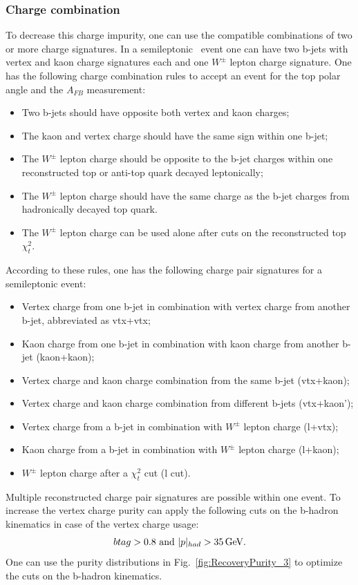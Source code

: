 \subsubsection{Charge combination}

To decrease this charge impurity, one can use the compatible combinations of two or more charge signatures.
In a semileptonic \ttbar\ event one can have two b-jets with vertex and kaon charge signatures each and one $W^\pm$ lepton charge signature. 
One has the following charge combination rules to accept an event for the top polar angle and the $A_{FB}$ measurement:
\begin{itemize}
	\item Two b-jets should have opposite both vertex and kaon charges;
	\item The kaon and vertex charge should have the same sign within one b-jet;
	\item The $W^\pm$ lepton charge should be opposite to the b-jet charges within one reconstructed top or anti-top quark decayed leptonically; 
	\item The  $W^\pm$ lepton charge should have the same charge as the b-jet charges from hadronically decayed top quark.
	\item The $W^\pm$ lepton charge can be used alone after cuts on the reconstructed top $\chi^2_{t}$.
\end{itemize}

According to these rules, one has the following charge pair signatures for a semileptonic \ttbar event:
\begin{itemize}
	\item Vertex charge from one b-jet in combination with vertex charge from another b-jet, abbreviated as {\sc vtx+vtx};
	\item Kaon charge from one b-jet in combination with kaon charge from another b-jet ({\sc kaon+kaon});
	\item Vertex charge and kaon charge combination from the same b-jet ({\sc vtx+kaon});
	\item Vertex charge and kaon charge combination from different b-jets ({\sc vtx+kaon'});
	\item  Vertex charge from a b-jet  in combination with $W^\pm$ lepton charge ({\sc l+vtx});
	\item  Kaon charge from a b-jet in combination with $W^\pm$ lepton charge ({\sc l+kaon});
	\item $W^\pm$ lepton charge after a $\chi^2_{t}$ cut  ({\sc l }cut).
\end{itemize}
Multiple reconstructed charge pair signatures are possible within one event.
To increase the vertex charge purity can apply the following cuts on the b-hadron kinematics in case of the vertex charge usage:
\begin{equation}
	btag > 0.8\text{ and } |p|_{had} > 35\text{\,GeV}.
\end{equation}
One can use the purity distributions in Fig.~\ref{fig:RecoveryPurity_3} to optimize the cuts on the b-hadron kinematics. 

